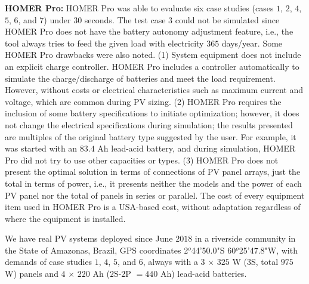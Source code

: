 \documentclass[10pt,journal,compsoc]{IEEEtran}
\begin{document}
\color{black} \textbf{HOMER Pro:} HOMER Pro was able to evaluate six case studies (cases $1$, $2$, $4$, $5$, $6$, and $7$) under $30$ seconds. The test case $3$ could not be simulated since HOMER Pro does not have the battery autonomy adjustment feature, i.e., the tool always tries to feed the given load with electricity $365$ days/year. Some HOMER Pro drawbacks were also noted. (1) System equipment does not include an explicit charge controller. HOMER Pro includes a controller automatically to simulate the charge/discharge of batteries and meet the load requirement. However, without costs or electrical characteristics such as maximum current and voltage, which are common during PV sizing. (2) HOMER Pro requires the inclusion of some battery specifications to initiate optimization; however, it does not change the electrical specifications during simulation; the results presented are multiples of the original battery type suggested by the user. For example, it was started with an $83.4$ Ah lead-acid battery, and during simulation, HOMER Pro did not try to use other capacities or types. (3) HOMER Pro does not present the optimal solution in terms of connections of PV panel arrays, just the total in terms of power, i.e., it presents neither the models and the power of each PV panel nor the total of panels in series or parallel. The cost of every equipment item used in HOMER Pro is a USA-based cost, without adaptation regardless of where the equipment is installed. \color{black}

We have real PV systems deployed since June $2018$ in a riverside community in the State of Amazonas, Brazil, GPS coordinates 2$^{o}$44'50.0"S 60$^{o}$25'47.8"W, with demands of case studies $1$, $4$, $5$, and $6$, always with a $3$ $\times$ $325$ W ($3$S, total $975$ W) panels and $4$ $\times$ $220$ Ah ($2$S-$2$P $= 440$ Ah) lead-acid batteries.
\end{document}

